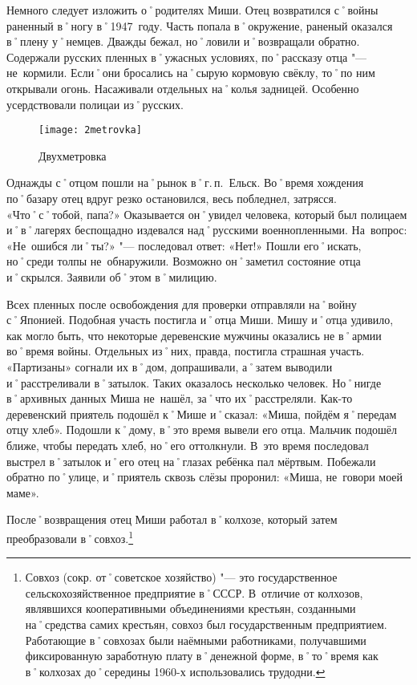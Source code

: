 Немного следует изложить о˚родителях Миши. Отец возвратился с˚войны раненный в˚ногу в˚1947~году. Часть попала в˚окружение, раненый оказался в˚плену у˚немцев. Дважды бежал, но˚ловили и˚возвращали обратно. Содержали русских пленных в˚ужасных условиях, по˚рассказу отца "--- не~кормили. Если˚они бросались на˚сырую кормовую свёклу, то˚по ним открывали огонь. Насаживали отдельных на˚колья задницей. Особенно усердствовали полицаи из˚русских. 

\begin{wrapfigure}{O}{.25\textwidth}
\centering
\texttt{[image: 2metrovka]}
\caption[Двухметровка]{Двухметровка\footnotemark}
\label{fig:2metrovka}
\end{wrapfigure}

Однажды с˚отцом пошли на˚рынок в˚г.\,п.~Ельск. Во˚время хождения по˚базару отец вдруг резко остановился, весь побледнел, затрясся. «Что˚с˚тобой, папа?» Оказывается он˚увидел человека, который был полицаем и˚в˚лагерях беспощадно издевался над˚русскими военнопленными. На~вопрос: «Не~ошибся ли˚ты?» "--- последовал ответ: «Нет!» Пошли его˚искать, но˚среди толпы не~обнаружили. Возможно он˚заметил состояние отца и˚скрылся. Заявили об˚этом в˚милицию.

Всех пленных после освобождения для проверки отправляли на˚войну с˚Японией. Подобная участь постигла и˚отца Миши. Мишу и˚отца удивило, как могло быть, что некоторые деревенские мужчины оказались не в˚армии во˚время войны. Отдельных из˚них, правда, постигла страшная участь. «Партизаны» согнали их в˚дом, допрашивали, а˚затем выводили и˚расстреливали в˚затылок. Таких оказалось несколько человек. Но˚нигде в˚архивных данных Миша не~нашёл, за˚что их˚расстреляли. Как-то деревенский приятель подошёл к˚Мише и˚сказал: «Миша, пойдём я˚передам отцу хлеб». Подошли к˚дому, в˚это время вывели его отца. Мальчик подошёл ближе, чтобы передать хлеб, но˚его оттолкнули. В~это время последовал выстрел в˚затылок и˚его отец на˚глазах ребёнка пал мёртвым. Побежали обратно по˚улице, и˚приятель сквозь слёзы проронил: «Миша, не~говори моей маме».

После˚возвращения отец Миши работал в˚колхозе, который затем преобразовали в˚совхоз.\footnote{Совхоз (сокр. от˚советское хозяйство) "--- это государственное сельскохозяйственное предприятие в˚СССР. В~отличие от колхозов, являвшихся кооперативными объединениями крестьян, созданными на˚средства самих крестьян, совхоз был государственным предприятием. Работающие в˚совхозах были наёмными работниками, получавшими фиксированную заработную плату в˚денежной форме, в˚то˚время как в˚колхозах до˚середины 1960-х использовались трудодни.}

